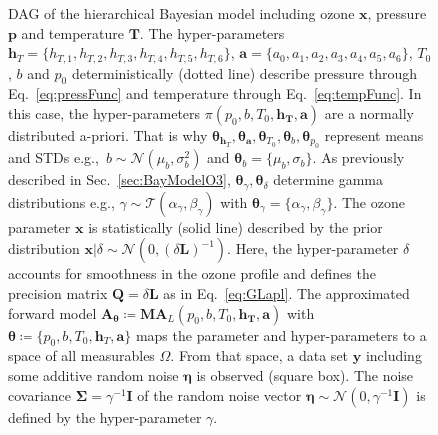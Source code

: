 \begin{figure}[thb!]
	\caption[Directed acyclic graph of Bayesian model for ozone $\bm{x}$, pressure $\bm{p}$ and temperature $\bm{T}$.]{DAG of the hierarchical Bayesian model including ozone $\bm{x}$, pressure $\bm{p}$ and temperature $\bm{T}$. The hyper-parameters $\bm{h}_T= \{ h_{T,1}, h_{T,2},h_{T,3},h_{T,4},h_{T,5},h_{T,6}\}$, $\bm{a} = \{ a_0, a_1, a_2,a_3,a_4,a_5,a_6\}$, $T_0$, $b$ and $p_0$ deterministically (dotted line) describe pressure through Eq.~\ref{eq:pressFunc} and temperature through Eq.~\ref{eq:tempFunc}. In this case, the hyper-parameters $\pi(p_0,b,T_0,\bm{h_T},\bm{a})$ are a normally distributed a-priori. That is why $\bm{\theta}_{\bm{h}_T},\bm{\theta}_{\bm{a}}, \bm{\theta}_{T_{0}},\bm{\theta}_{b} , \bm{\theta}_{p_0}$ represent means and STDs e.g.,~$b \sim \mathcal{N}(\mu_b, \sigma^2_b)$ and $\bm{\theta}_{b} = \{\mu_b, \sigma_b\}$.
	As previously described in Sec.~\ref{sec:BayModelO3}, $\bm{\theta}_{\gamma}, \bm{\theta}_{\delta}$ determine gamma distributions e.g., $\gamma \sim \mathcal{T}(\alpha_{\gamma},\beta_{\gamma}) $ with $\bm{\theta}_{\gamma} = 	\{\alpha_{\gamma},\beta_{\gamma} \}$.
	The ozone parameter $\bm{x}$ is statistically (solid line) described by the prior distribution $\bm{x}| \delta \sim \mathcal{N}(0,(\delta \bm{L})^{-1}) $. 
	Here, the hyper-parameter $\delta$ accounts for smoothness in the ozone profile and defines the precision matrix $\bm{Q} = \delta \bm{L}$ as in Eq.~\ref{eq:GLapl}.
	The approximated forward model $\bm{A}_{\bm{\theta}} \coloneqq \bm{M}\bm{A}_L(p_0,b,T_0,\bm{h_T},\bm{a})$ with $\bm{\theta}  \coloneqq \{p_0, b, T_0,\bm{h}_T,\bm{a} \}$ maps the parameter and hyper-parameters to a space of all measurables $\Omega$. 
	From that space, a data set $\bm{y}$ including some additive random noise $\bm{\eta}$ is observed (square box).
	The noise covariance $\bm{\Sigma} = \gamma^{-1} \bm{I}$ of the random noise vector $\bm{\eta} \sim \mathcal{N}(0,\gamma^{-1} \bm{I} ) $ is defined by the hyper-parameter $\gamma$.}
	\label{fig:DAGComplete}
\end{figure}
